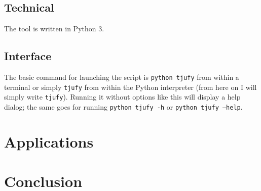 \documentclass[10pt,a4paper,twoside,openright,titlepage,fleqn,%
               headinclude,,footinclude,BCOR5mm,%
               numbers=noenddot,cleardoublepage=empty,%
               tablecaptionabove]{scrbook}
\begin{document}
\section{Technical} %
\label{sec:tool-technical}
The tool is written in Python 3. 

\section{Interface} %
\label{sec:interface}

The basic command for launching the script is \texttt{python tjufy} from within
a terminal or simply \texttt{tjufy} from within the Python interpreter (from
here on I will simply write \texttt{tjufy}). Running it without options like this
will display a help dialog; the same goes for running \texttt{python tjufy -h}
or \texttt{python tjufy --help}.


\chapter{Applications} \label{chp:design} \minitoc\mtcskip

\chapter{Conclusion} %
\label{cha:conclusion}


\backmatter
\clearpage

%
\end{document}
